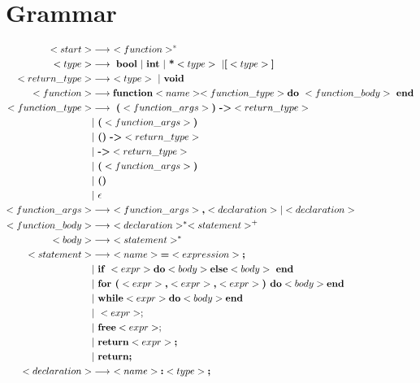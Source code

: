 \documentclass{article}
\begin{document}
\section{Grammar}
\begin{align*}
<start> &\longrightarrow \ <function>^* \\
<type> &\longrightarrow \ \textbf{bool} \ | \ \textbf{int} \ | \ \textbf{*} <type> \ | \textbf{[} <type> \textbf{]}\\
<return\_type> &\longrightarrow \ <type> \ | \ \textbf{void} \\
<function>  &\longrightarrow  \textbf{function} <name> <function\_type> \textbf{do} \ <function\_body> \ \textbf{end} \\
<function\_type> &\longrightarrow \ 
\textbf{(} <function\_args> \textbf{)} \ 
\textbf{-\textgreater} <return\_type>\\
&| \ \textbf{(} <function\_args> \textbf{)} \\
&| \ \textbf{()} \  \textbf{-\textgreater} <return\_type> \\
&| \ \textbf{-\textgreater} <return\_type> \\
&| \ \textbf{(} <function\_args> \textbf{)} \\
&| \  \textbf{()} \\
&| \ \epsilon \\
<function\_args> &\longrightarrow \  <function\_args> \textbf{,} <declaration> | <declaration> \\
<function\_body> &\longrightarrow \ <declaration>^* <statement>^+ \\
<body> &\longrightarrow \ <statement>^* \\
<statement> &\longrightarrow  \ <name> \textbf{=} <expression> \textbf{;}\\ 
    &| \ \textbf{if } <expr> \textbf{do} <body> \textbf{else} <body>  \ \textbf{end} \\
    &| \ \textbf{for (} <expr> \textbf{,} <expr> \textbf{,} <expr> \textbf{) do} <body> \textbf{end} \\ 
    &| \ \textbf{while} <expr> \textbf{do} <body> \textbf{end} \\
    &| \ <expr>; \\
    &| \ \textbf{free} <expr>; \\
    &| \ \textbf{return} <expr> \textbf{;} \\
    &| \ \textbf{return;} \\
<declaration>  &\longrightarrow \ <name> \textbf{:} <type> \textbf{;} \\

\end{align*}
\end{document}

